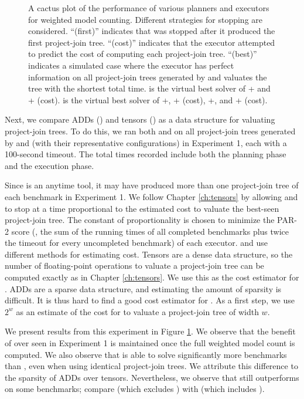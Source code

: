 \begin{figure}[t]
	\centering
	
    \vspace*{-1cm}
	\caption{
	A cactus plot of the performance of various planners and executors for weighted model counting.
    Different strategies for stopping \Lg{} are considered.
    ``(first)'' indicates that \Lg{} was stopped after it produced the first project-join tree.
    ``(cost)'' indicates that the executor attempted to predict the cost of computing each project-join tree.
    ``(best)'' indicates a simulated case where the executor has perfect information on all project-join trees generated by \Lg{} and valuates the tree with the shortest total time.
     is the virtual best solver of \Dmc{}+\Htb{} and \Dmc{}+\Lg{} (cost).
	 is the virtual best solver of \Dmc{}+\Htb{}, \Dmc{}+\Lg{} (cost), \Tensor{}+\Htb{}, and \Tensor{}+\Lg{} (cost).}
	\label{fig:execution}
\end{figure}

Next, we compare ADDs (\Dmc) and tensors (\Tensor) as a data structure for valuating project-join trees.
To do this, we ran both \Dmc{} and \Tensor{} on all project-join trees generated by \Htb{} and \Lg{} (with their representative configurations) in Experiment 1, each with a 100-second timeout.
The total times recorded include both the planning phase and the execution phase.

Since \Lg{} is an anytime tool, it may have produced more than one project-join tree of each benchmark in Experiment 1.
We follow Chapter \ref{ch:tensors} by allowing \Tensor{} and \Dmc{} to stop \Lg{} at a time proportional to the estimated cost to valuate the best-seen project-join tree.
The constant of proportionality is chosen to minimize the PAR-2 score (\ie, the sum of the running times of all completed benchmarks plus twice the timeout for every uncompleted benchmark) of each executor.
\Tensor{} and \Dmc{} use different methods for estimating cost.
Tensors are a dense data structure, so the number of floating-point operations to valuate a project-join tree can be computed exactly as in Chapter \ref{ch:tensors}.
We use this as the cost estimator for \Tensor{}.
ADDs are a sparse data structure, and estimating the amount of sparsity is difficult.
It is thus hard to find a good cost estimator for \Dmc{}.
As a first step, we use $2^w$ as an estimate of the cost for \Dmc{} to valuate a project-join tree of width $w$.

We present results from this experiment in Figure \ref{fig:execution}.
We observe that the benefit of \Lg{} over \Htb{} seen in Experiment 1 is maintained once the full weighted model count is computed.
We also observe that \Dmc{} is able to solve significantly more benchmarks than \Tensor{}, even when using identical project-join trees.
We attribute this difference to the sparsity of ADDs over tensors.
Nevertheless, we observe that \Tensor{} still outperforms \Dmc{} on some benchmarks; compare  (which excludes \Tensor{}) with  (which includes \Tensor{}).

